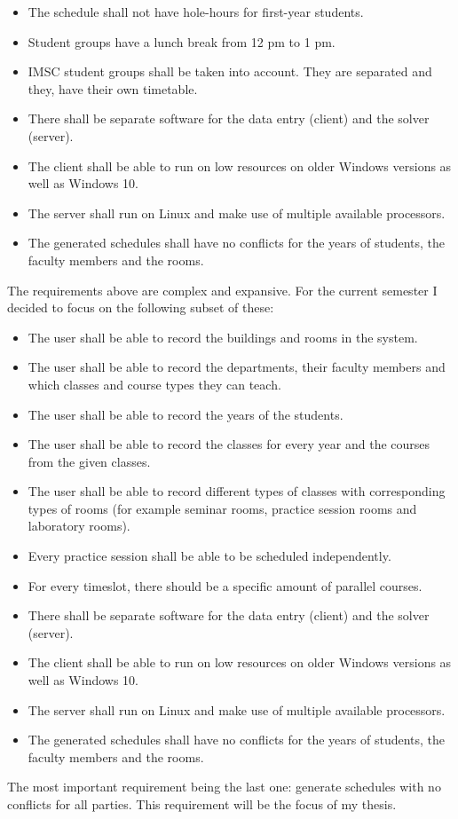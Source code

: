 \begin{itemize}
\item The schedule shall not have hole-hours for first-year students.
\item Student groups have a lunch break from 12 pm to 1 pm.
\item IMSC student groups shall be taken into account. They are separated and they, have their own timetable.
\item There shall be separate software for the data entry (client) and the solver (server).
\item The client shall be able to run on low resources on older Windows versions as well as Windows 10.
\item The server shall run on Linux and make use of multiple available processors.
\item The generated schedules shall have no conflicts for the years of students, the faculty members and the rooms.
\end{itemize}

The requirements above are complex and expansive. For the current semester I decided to focus on the following subset of these:

\begin{itemize}
\item The user shall be able to record the buildings and rooms in the system.
\item The user shall be able to record the departments, their faculty members and which classes and course types they can teach.
\item The user shall be able to record the years of the students.
\item The user shall be able to record the classes for every year and the courses from the given classes.
\item The user shall be able to record different types of classes with corresponding types of rooms (for example seminar rooms, practice session rooms and laboratory rooms).
\item Every practice session shall be able to be scheduled independently.
\item For every timeslot, there should be a specific amount of parallel courses.
\item There shall be separate software for the data entry (client) and the solver (server).
\item The client shall be able to run on low resources on older Windows versions as well as Windows 10.
\item The server shall run on Linux and make use of multiple available processors.
\item The generated schedules shall have no conflicts for the years of students, the faculty members and the rooms.
\end{itemize}

The most important requirement being the last one: generate schedules with no conflicts for all parties. This requirement will be the focus of my thesis.
